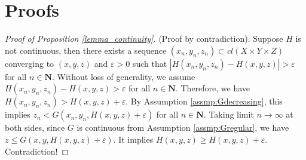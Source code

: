 \documentclass[a4paper, 11pt]{amsart}
\numberwithin{equation}{section}
\theoremstyle{plain}
\theoremstyle{definition}
\theoremstyle{remark}
\newcommand{\N}{\mathbf{N}}
\begin{document}
\section{Proofs}\label{section:proofs}

\begin{proof}[Proof of Proposition \ref{lemma_continuity}]
	(Proof by contradiction). Suppose $H$ is not continuous, then there exists a sequence ${(x_n, y_n, z_n)} \subset cl(X\times Y \times Z)$ converging to $(x, y, z)$ and $\varepsilon >0$ such that $|H(x_n, y_n, z_n) - H(x,y,z)|>\varepsilon$ for all $n\in \N$. Without loss of generality, we assume $H(x_n, y_n, z_n) - H(x,y,z)>\varepsilon$ for all $n\in \N$. Therefore, we have $H(x_n, y_n, z_n) > H(x,y,z)+\varepsilon$. By Assumption \ref{assmp:Gdecreasing}, this implies $z_n < G(x_n, y_n, H(x,y,z)+\varepsilon)$ for all $n\in \N$. Taking limit $n\longrightarrow \infty$ at both sides, since $G$ is continuous from Assumption \ref{assmp:Gregular}, we have $z \le G(x, y, H(x,y,z)+\varepsilon)$. It implies $H(x,y,z) \ge H(x,y,z)+\varepsilon$. Contradiction!
\end{proof}

\vspace{0.3cm}
\end{document}
